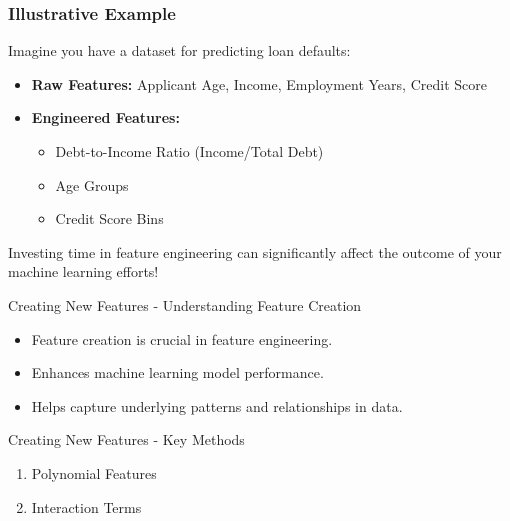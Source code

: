 \documentclass[aspectratio=169]{beamer}
\begin{document}
\begin{frame}[fragile]
    \frametitle{Illustrative Example}
    Imagine you have a dataset for predicting loan defaults:
    \begin{itemize}
        \item \textbf{Raw Features:} Applicant Age, Income, Employment Years, Credit Score
        \item \textbf{Engineered Features:} 
        \begin{itemize}
            \item Debt-to-Income Ratio (Income/Total Debt)
            \item Age Groups
            \item Credit Score Bins
        \end{itemize}
    \end{itemize}
    
    Investing time in feature engineering can significantly affect the outcome of your machine learning efforts!
\end{frame}

\begin{frame}[fragile]{Creating New Features - Understanding Feature Creation}
    \begin{itemize}
        \item Feature creation is crucial in feature engineering.
        \item Enhances machine learning model performance.
        \item Helps capture underlying patterns and relationships in data.
    \end{itemize}
\end{frame}

\begin{frame}[fragile]{Creating New Features - Key Methods}
    \begin{enumerate}
        \item Polynomial Features
        \item Interaction Terms
    \end{enumerate}
\end{frame}
\end{document}
